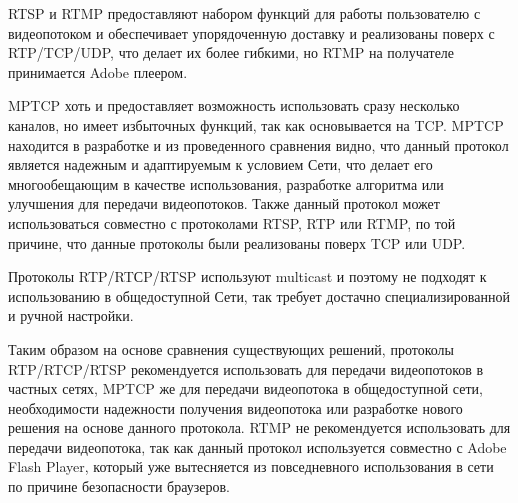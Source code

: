 RTSP и RTMP предоставляют набором функций для работы пользователю с видеопотоком и обеспечивает упорядоченную доставку и реализованы поверх с RTP/TCP/UDP, что делает их более гибкими, но RTMP на получателе принимается Adobe плеером.

MPTCP хоть и предоставляет возможность использовать сразу несколько каналов, но имеет избыточных функций, так как основывается на TCP.
MPTCP находится в разработке и из проведенного сравнения видно, что данный протокол является надежным и адаптируемым к условием Сети, что делает его многообещающим в качестве использования, разработке алгоритма или улучшения для передачи видеопотоков. Также данный протокол может использоваться совместно с протоколами RTSP, RTP или RTMP, по той причине, что данные протоколы были реализованы поверх TCP или UDP.

Протоколы RTP/RTСP/RTSP используют multicast и поэтому не подходят к использованию в общедоступной Сети, так требует достачно специализированной и ручной настройки.

Таким образом на основе сравнения существующих решений, протоколы RTP/RTCP/RTSP рекомендуется использовать для передачи видеопотоков в частных сетях, MPTCP же для передачи видеопотока в общедоступной сети, необходимости надежности получения видеопотока или разработке нового решения на основе данного протокола.
RTMP не рекомендуется использовать для передачи видеопотока, так как данный протокол используется совместно с Adobe Flash Player, который уже вытесняется из повседневного использования в сети по причине безопасности браузеров.